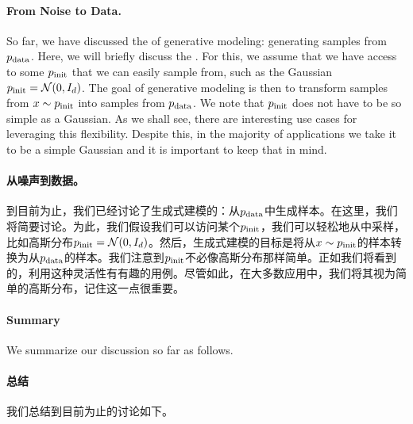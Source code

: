 \paragraph{From Noise to Data.} So far, we have discussed the  of generative modeling: generating samples from $p_{\rm{data}}$. Here, we will briefly discuss the . For this, we assume that we have access to some  $p_{\rm{init}}$ that we can easily sample from, such as the Gaussian $p_{\rm{init}}=\mathcal{N}(0,I_d)$. The goal of generative modeling is then to transform samples from $x\sim p_{\rm{init}}$ into samples from $p_{\rm{data}}$. We note that $p_{\rm{init}}$ does not have to be so simple as a Gaussian. As we shall see, there are interesting use cases for leveraging this flexibility. Despite this, in the majority of applications we take it to be a simple Gaussian and it is important to keep that in mind.

\paragraph{从噪声到数据。} 到目前为止，我们已经讨论了生成式建模的：从$p_{\rm{data}}$中生成样本。在这里，我们将简要讨论。为此，我们假设我们可以访问某个$p_{\rm{init}}$，我们可以轻松地从中采样，比如高斯分布$p_{\rm{init}}=\mathcal{N}(0,I_d)$。然后，生成式建模的目标是将从$x\sim p_{\rm{init}}$的样本转换为从$p_{\rm{data}}$的样本。我们注意到$p_{\rm{init}}$不必像高斯分布那样简单。正如我们将看到的，利用这种灵活性有有趣的用例。尽管如此，在大多数应用中，我们将其视为简单的高斯分布，记住这一点很重要。

\paragraph{Summary} We summarize our discussion so far as follows.\label{par:summary}

\paragraph{总结} 我们总结到目前为止的讨论如下。

